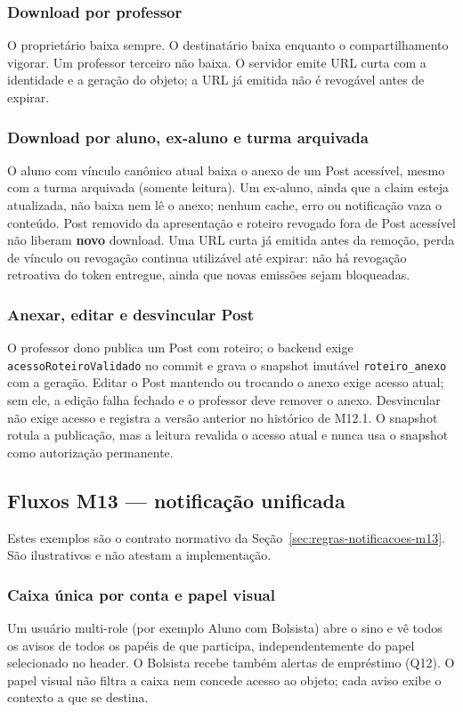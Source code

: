 \subsubsection{Download por professor}
O proprietário baixa sempre. O destinatário baixa enquanto o compartilhamento
vigorar. Um professor terceiro não baixa. O servidor emite URL curta com a
identidade e a geração do objeto; a URL já emitida não é revogável antes de
expirar.

\subsubsection{Download por aluno, ex-aluno e turma arquivada}
O aluno com vínculo canônico atual baixa o anexo de um Post acessível, mesmo com
a turma arquivada (somente leitura). Um ex-aluno, ainda que a claim esteja
atualizada, não baixa nem lê o anexo; nenhum cache, erro ou notificação vaza o
conteúdo. Post removido da apresentação e roteiro revogado fora de Post
acessível não liberam \textbf{novo} download. Uma URL curta já emitida antes da
remoção, perda de vínculo ou revogação continua utilizável até expirar: não há
revogação retroativa do token entregue, ainda que novas emissões sejam
bloqueadas.

\subsubsection{Anexar, editar e desvincular Post}
O professor dono publica um Post com roteiro; o backend exige
\texttt{acessoRoteiroValidado} no commit e grava o snapshot imutável
\texttt{roteiro\_anexo} com a geração. Editar o Post mantendo ou trocando o
anexo exige acesso atual; sem ele, a edição falha fechado e o professor deve
remover o anexo. Desvincular não exige acesso e registra a versão anterior no
histórico de M12.1. O snapshot rotula a publicação, mas a leitura revalida o
acesso atual e nunca usa o snapshot como autorização permanente.

\subsection{Fluxos M13 --- notificação unificada}
Estes exemplos são o contrato normativo da
Seção~\ref{sec:regras-notificacoes-m13}. São ilustrativos e não atestam a
implementação.

\subsubsection{Caixa única por conta e papel visual}
Um usuário multi-role (por exemplo Aluno com Bolsista) abre o sino e vê todos
os avisos de todos os papéis de que participa, independentemente do papel
selecionado no header. O Bolsista recebe também alertas de empréstimo (Q12). O
papel visual não filtra a caixa nem concede acesso ao objeto; cada aviso exibe
o contexto a que se destina.

